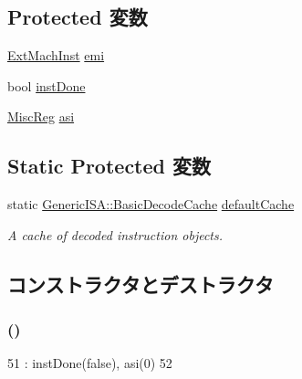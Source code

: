 \subsection*{Protected 変数}
\begin{DoxyCompactItemize}
\item 
\hyperlink{namespaceSparcISA_aec686c38e40c7f794f1435591c15c275}{ExtMachInst} \hyperlink{classSparcISA_1_1Decoder_abf211faf305b89c9093b00b6b82b0bd1}{emi}
\item 
bool \hyperlink{classSparcISA_1_1Decoder_a37c5d55785204b8fd00a8ebf62e1fc33}{instDone}
\item 
\hyperlink{namespaceSparcISA_aa16539aa6584fd12f7d6fa868f75b4de}{MiscReg} \hyperlink{classSparcISA_1_1Decoder_a68b5e09d28d72c00580cac530947a376}{asi}
\end{DoxyCompactItemize}
\subsection*{Static Protected 変数}
\begin{DoxyCompactItemize}
\item 
static \hyperlink{classGenericISA_1_1BasicDecodeCache}{GenericISA::BasicDecodeCache} \hyperlink{classSparcISA_1_1Decoder_a8800313f93afe356e1177866068cc8d6}{defaultCache}
\begin{DoxyCompactList}\small\item\em A cache of decoded instruction objects. \item\end{DoxyCompactList}\end{DoxyCompactItemize}


\subsection{コンストラクタとデストラクタ}
\hypertarget{classSparcISA_1_1Decoder_aedfa2b7d97ed17b14903ed75d6214c78}{
\subsubsection[{Decoder}]{ ()}}
\label{classSparcISA_1_1Decoder_aedfa2b7d97ed17b14903ed75d6214c78}



\begin{DoxyCode}
51               : instDone(false), asi(0)
52     {}
\end{DoxyCode}


